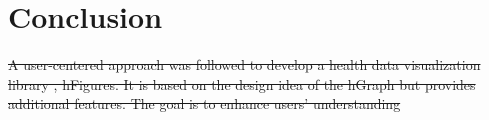\documentclass[twocolumn]{bmcart}%
\providecommand{\DIFdel}[1]{{\protect\color{red}\sout{#1}}}                      %
\providecommand{\DIFaddbegin}{} %
\providecommand{\DIFaddend}{} %
\providecommand{\DIFdelbegin}{} %
\providecommand{\DIFdelend}{} %
\begin{document}

\DIFaddend \section*{Conclusion}

\DIFdelbegin \DIFdel{A user-centered approach was followed to develop a health data visualization library , hFigures. It is based on the design idea of the hGraph but provides additional features. The goal is to enhance users' understanding }\DIFdelend %
\DIFaddbegin 


\end{document}
